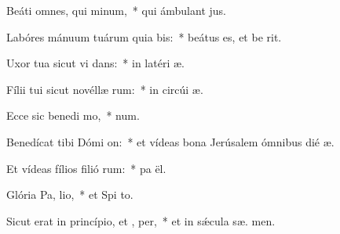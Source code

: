 \item Beáti omnes, qui  minum,~* qui ámbulant   jus.
\item Labóres mánuum tuárum quia bis:~* beátus es, et be  rit.
\item Uxor tua sicut vi dans:~* in latéri  æ.
\item Fílii tui sicut novéllæ rum:~* in circúi  æ.
\item Ecce sic benedi mo,~*   num.
\item Benedícat tibi Dómi  on:~* et vídeas bona Jerúsalem ómnibus dié  æ.
\item Et vídeas fílios filió rum:~* pa  ël.
\item Glória Pa,  lio,~* et Spi to.
\item Sicut erat in princípio, et ,  per,~* et in sǽcula sæ. men.
